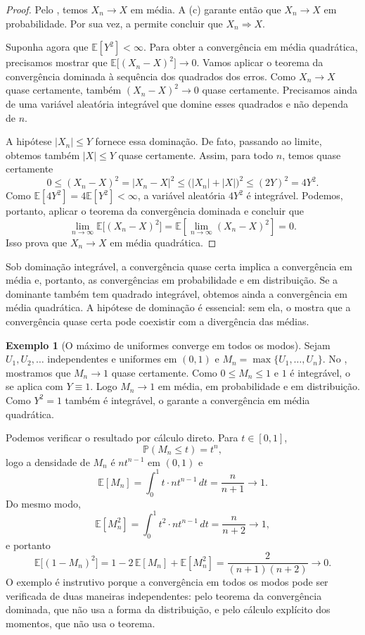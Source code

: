 \documentclass[12pt,portuguese]{article}
\theoremstyle{definition}
\newtheorem{example}[example]{Exemplo}
\theoremstyle{plainexercise}
\theoremstyle{starredexercise}
\theoremstyle{definition}
\begin{document}
\begin{proof}
Pelo , temos $X_n\to X$ em média. A
(c) garante então que $X_n\to X$ em probabilidade.
Por sua vez, a  permite concluir que
$X_n\Rightarrow X$.

Suponha agora que $\mathbb{E}[Y^2]<\infty$. Para obter a convergência em
média quadrática, precisamos mostrar que
$\mathbb{E}\bigl[(X_n-X)^2\bigr]\to0$. Vamos aplicar o teorema da
convergência dominada à sequência dos quadrados dos erros. Como $X_n\to X$
quase certamente, também $(X_n-X)^2\to0$ quase certamente. Precisamos ainda
de uma variável aleatória integrável que domine esses quadrados e não dependa
de $n$.

A hipótese $|X_n|\leqslant Y$ fornece essa dominação. De fato, passando ao
limite, obtemos também $|X|\leqslant Y$ quase certamente. Assim, para todo
$n$, temos quase certamente
\[
0\leqslant(X_n-X)^2
=|X_n-X|^2
\leqslant\bigl(|X_n|+|X|\bigr)^2
\leqslant(2Y)^2
=4Y^2.
\]
Como $\mathbb{E}[4Y^2]=4\mathbb{E}[Y^2]<\infty$, a variável aleatória
$4Y^2$ é integrável. Podemos, portanto, aplicar o teorema da convergência
dominada e concluir que
\[
\lim_{n\to\infty}\mathbb{E}\bigl[(X_n-X)^2\bigr]
=\mathbb{E}\left[\lim_{n\to\infty}(X_n-X)^2\right]
=0.
\]
Isso prova que $X_n\to X$ em média quadrática.
\end{proof}

Sob dominação integrável, a convergência quase certa implica a convergência em
média e, portanto, as convergências em probabilidade e em distribuição. Se a
dominante também tem quadrado integrável, obtemos ainda a convergência em média
quadrática. A hipótese de dominação é essencial: sem ela, o
 mostra que a convergência quase certa pode coexistir com
a divergência das médias.

\begin{example}[O máximo de uniformes converge em todos os modos]
\label{ex:maximo-todos}
Sejam $U_1,U_2,\ldots$ independentes e uniformes em $(0,1)$ e
$M_n=\max\{U_1,\ldots,U_n\}$. No , mostramos que
$M_n\to1$ quase certamente. Como $0\leqslant M_n\leqslant1$ e $1$ é
integrável, o  se aplica com $Y\equiv1$. Logo
$M_n\to1$ em média, em probabilidade e em distribuição. Como $Y^2=1$ também é
integrável, o  garante a convergência em média quadrática.

Podemos verificar o resultado por cálculo direto. Para $t\in[0,1]$,
\[
\mathbb{P}(M_n\leqslant t)=t^n,
\]
logo a densidade de $M_n$ é $nt^{n-1}$ em $(0,1)$ e
\[
\mathbb{E}[M_n]=\int_0^1t\cdot nt^{n-1}\,dt=\frac{n}{n+1}\longrightarrow1.
\]
Do mesmo modo,
\[
\mathbb{E}[M_n^2]=\int_0^1t^2\cdot nt^{n-1}\,dt=\frac{n}{n+2}\longrightarrow1,
\]
e portanto
\[
\mathbb{E}\bigl[(1-M_n)^2\bigr]
=
1-2\,\mathbb{E}[M_n]+\mathbb{E}[M_n^2]
=
\frac{2}{(n+1)(n+2)}\longrightarrow0.
\]
O exemplo é instrutivo porque a convergência em todos os modos pode ser
verificada de duas maneiras independentes: pelo teorema da convergência
dominada, que não usa a forma da distribuição, e pelo cálculo explícito dos
momentos, que não usa o teorema.
\end{example}
\end{document}
